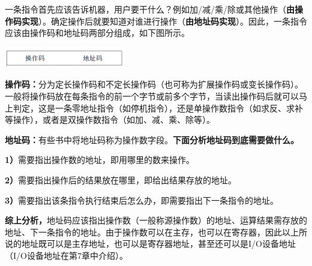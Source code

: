一条指令首先应该告诉机器，用户要干什么？例如加/减/乘/除或其他操作（\textbf{{由操作码实现}}）。确定操作后就要知道对谁进行操作（\textbf{{由地址码实现}}）。因此，一条指令应该由操作码和地址码两部分组成，如下图所示。

\includegraphics[width=2.08333in,height=0.35417in]{png-jpeg-pics/455DC55DE6F394CD8BD0B00DEFD79F74.png}

\textbf{操作码：}分为定长操作码和不定长操作码（也可称为扩展操作码或变长操作码）。一般将操作码放在每条指令的前一个字节或前多个字节，当读出操作码后就可以马上判定，这是一条零地址指令（如停机指令），还是单操作数指令（如求反、求补等操作），或者是双操作数指令（如加、减、乘、除等）。

\textbf{地址码：}有些书中将地址码称为操作数字段。\textbf{{下面分析地址码到底需要做什么。}}

\textbf{1）}需要指出操作数的地址，即用哪里的数来操作。

\textbf{2）}需要指出操作后的结果放在哪里，即给出结果存放的地址。

\textbf{3）}需要指出该条指令执行结束后怎么办，即需要指出下一条指令的地址。

\textbf{综上分析，}地址码应该指出操作数（一般称源操作数）的地址、运算结果需存放的地址、下一条指令的地址。由于操作数可以在主存，也可以在寄存器，因此以上所说的地址既可以是主存地址，也可以是寄存器地址，甚至还可以是I/O设备地址（I/O设备地址在第7章中介绍）。
